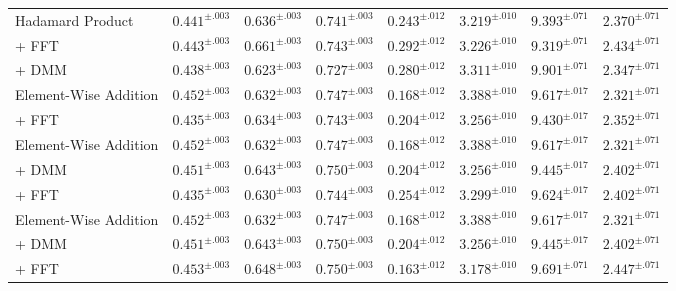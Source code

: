 \documentclass[a4paper,12pt]{article}
\begin{document}
\begin{table}[t]
\begin{tabular}{l|ccc|c|c|c|c}
Hadamard Product           & $0.441^{\pm.003}$ & $0.636^{\pm.003}$ & $0.741^{\pm.003}$ & $0.243^{\pm.012}$ & $3.219^{\pm.010}$ & $9.393^{\pm.071}$ & $2.370^{\pm.071}$ \\
\hspace*{1em} + FFT         & $0.443^{\pm.003}$ & $0.661^{\pm.003}$ & $0.743^{\pm.003}$ & $0.292^{\pm.012}$ & $3.226^{\pm.010}$ & $9.319^{\pm.071}$ & $2.434^{\pm.071}$ \\
\hspace*{2em} + DMM      & $0.438^{\pm.003}$ & $0.623^{\pm.003}$ & $0.727^{\pm.003}$ & $0.280^{\pm.012}$ & $3.311^{\pm.010}$ & $9.901^{\pm.071}$ & $2.347^{\pm.071}$ \\  \midrule
Element-Wise Addition       & $0.452^{\pm.003}$ & $0.632^{\pm.003}$ & $0.747^{\pm.003}$ & $0.168^{\pm.012}$ & $3.388^{\pm.010}$ & $9.617^{\pm.017}$ & $2.321^{\pm.071}$ \\
\hspace*{1em} + FFT         & $0.435^{\pm.003}$ & $0.634^{\pm.003}$ & $0.743^{\pm.003}$ & $0.204^{\pm.012}$ & $3.256^{\pm.010}$ & $9.430^{\pm.017}$ & $2.352^{\pm.071}$ \\ \midrule
Element-Wise Addition       & $0.452^{\pm.003}$ & $0.632^{\pm.003}$ & $0.747^{\pm.003}$ & $0.168^{\pm.012}$ & $3.388^{\pm.010}$ & $9.617^{\pm.017}$ & $2.321^{\pm.071}$ \\
\hspace*{1em}+ DMM         & $0.451^{\pm.003}$ & $0.643^{\pm.003}$ & $0.750^{\pm.003}$ & $0.204^{\pm.012}$ & $3.256^{\pm.010}$ & $9.445^{\pm.017}$ & $2.402^{\pm.071}$ \\ 
\hspace*{2em} + FFT & $0.435^{\pm.003}$ & $0.630^{\pm.003}$ & $0.744^{\pm.003}$ & $0.254^{\pm.012}$ & $3.299^{\pm.010}$ & $9.624^{\pm.017}$ & $2.402^{\pm.071}$ \\ \midrule
Element-Wise Addition       & $0.452^{\pm.003}$ & $0.632^{\pm.003}$ & $0.747^{\pm.003}$ & $0.168^{\pm.012}$ & $3.388^{\pm.010}$ & $9.617^{\pm.017}$ & $2.321^{\pm.071}$ \\
\hspace*{1em}+ DMM         & $0.451^{\pm.003}$ & $0.643^{\pm.003}$ & $0.750^{\pm.003}$ & $0.204^{\pm.012}$ & $3.256^{\pm.010}$ & $9.445^{\pm.017}$ & $2.402^{\pm.071}$ \\ 
\hspace*{1em}+ FFT & $0.453^{\pm.003}$ & $0.648^{\pm.003}$ & $0.750^{\pm.003}$ & $0.163^{\pm.012}$ & $3.178^{\pm.010}$ & $9.691^{\pm.071}$ & $2.447^{\pm.071}$ \\ 

\end{tabular}
\end{table}
\end{document}
